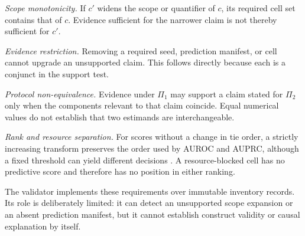 \emph{Scope monotonicity.} If $c'$ widens the scope or quantifier of $c$, its required cell set contains that of $c$. Evidence sufficient for the narrower claim is not thereby sufficient for $c'$.

\emph{Evidence restriction.} Removing a required seed, prediction manifest, or cell cannot upgrade an unsupported claim. This follows directly because each is a conjunct in the support test.

\emph{Protocol non-equivalence.} Evidence under $\Pi_1$ may support a claim stated for $\Pi_2$ only when the components relevant to that claim coincide. Equal numerical values do not establish that two estimands are interchangeable.

\emph{Rank and resource separation.} For scores without a change in tie order, a strictly increasing transform preserves the order used by AUROC and AUPRC, although a fixed threshold can yield different decisions \cite{guo2017calibration}. A resource-blocked cell has no predictive score and therefore has no position in either ranking.

The validator implements these requirements over immutable inventory records. Its role is deliberately limited: it can detect an unsupported scope expansion or an absent prediction manifest, but it cannot establish construct validity or causal explanation by itself.
